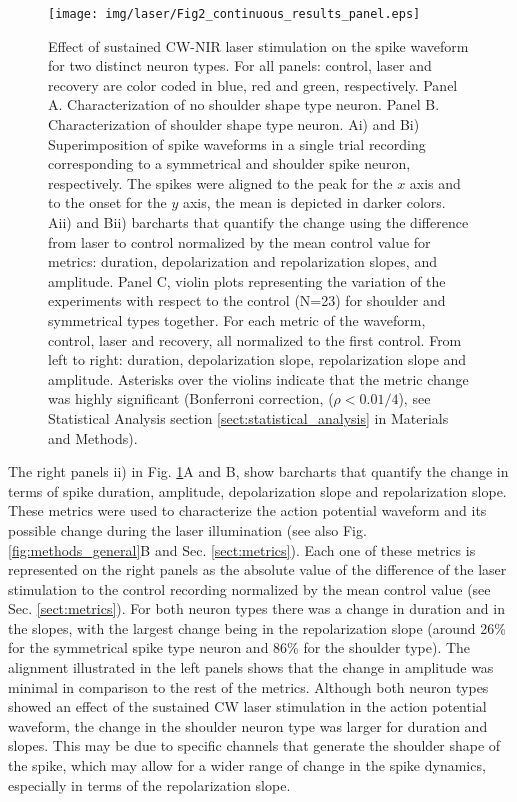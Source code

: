 \begin{figure}[htb!]
    \centering
    \texttt{[image: img/laser/Fig2\_continuous\_results\_panel.eps]}
    \caption{Effect of sustained CW-NIR laser stimulation on the spike waveform for two distinct neuron types. For all panels: control, laser and recovery are color coded in blue, red and green, respectively. Panel A. Characterization of no shoulder shape type neuron. Panel B. Characterization of shoulder shape type neuron. Ai) and Bi) Superimposition of spike waveforms in a single trial recording corresponding to a symmetrical and shoulder spike neuron, respectively. The spikes were aligned to the peak for the $x$ axis and to the onset for the $y$ axis, the mean is depicted in darker colors. Aii) and Bii) barcharts that quantify the change using the difference from laser to control normalized by the mean control value for metrics: duration, depolarization and repolarization slopes, and amplitude. Panel C, violin plots representing the variation of the experiments with respect to the control (N=23) for shoulder and symmetrical types together. For each metric of the waveform, control, laser and recovery, all normalized to the first control. From left to right: duration, depolarization slope, repolarization slope and amplitude. Asterisks over the violins indicate that the metric change was highly significant (Bonferroni correction, ($\rho<0.01/4$), see Statistical Analysis section \ref{sect:statistical_analysis} in Materials and Methods).}
    \label{fig:continuous_results_panel}
\end{figure}

The right panels ii) in Fig. \ref{fig:continuous_results_panel}A and B, show barcharts that quantify the change in terms of spike duration, amplitude, depolarization slope and repolarization slope. These metrics were used to characterize the action potential waveform and its possible change during the laser illumination (see also Fig. \ref{fig:methods_general}B and Sec. \ref{sect:metrics}). Each one of these metrics is represented on the right panels as the absolute value of the difference of the laser stimulation to the control recording normalized by the mean control value (see Sec. \ref{sect:metrics}). For both neuron types there was a change in duration and in the slopes, with the largest change being in the repolarization slope (around 26\% for the symmetrical spike type neuron and 86\% for the shoulder type). The alignment illustrated in the left panels shows that the change in amplitude was minimal in comparison to the rest of the metrics. Although both neuron types showed an effect of the sustained CW laser stimulation in the action potential waveform, the change in the shoulder neuron type was larger for duration and slopes. This may be due to specific channels that generate the shoulder shape of the spike, which may allow for a wider range of change in the spike dynamics, especially in terms of the repolarization slope. 


